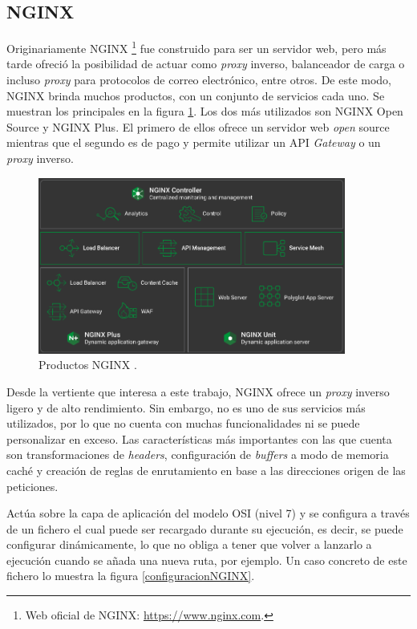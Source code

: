 \documentclass[11pt,spanish,listoffigures]{tfgetsinf}
\begin{document}

		\subsection{NGINX}

Originariamente NGINX \footnote{Web oficial de NGINX: \url{https://www.nginx.com}.} fue construido para ser un servidor web, pero más tarde ofreció la posibilidad de actuar como \emph{proxy} inverso, balanceador de carga o incluso \emph{proxy} para protocolos de correo electrónico, entre otros. De este modo, NGINX brinda muchos productos, con un conjunto de servicios cada uno. Se muestran los principales en la figura \ref{productosNGINX}. Los dos más utilizados son NGINX Open Source y NGINX Plus. El primero de ellos ofrece un servidor web \emph{open} source mientras que el segundo es de pago y permite utilizar un API \emph{Gateway} o un \emph{proxy} inverso.

\begin{figure}[ht]
\centering
\includegraphics[width=0.9\textwidth]{imagenes/productosNGINX}
\caption[Productos NGINX.]{Productos NGINX \cite{NGINX}.}
	\label{productosNGINX}
\end{figure}

Desde la vertiente que interesa a este trabajo, NGINX ofrece un \emph{proxy} inverso ligero y de alto rendimiento. Sin embargo, no es uno de sus servicios más utilizados, por lo que no cuenta con muchas funcionalidades ni se puede personalizar en exceso. Las características más importantes con las que cuenta son transformaciones de \emph{headers}, configuración de \emph{buffers} a modo de memoria caché y creación de reglas de enrutamiento en base a las direcciones origen de las peticiones.

Actúa sobre la capa de aplicación del modelo OSI (nivel 7) y se configura a través de un fichero el cual puede ser recargado durante su ejecución, es decir, se puede configurar dinámicamente, lo que no obliga a tener que volver a lanzarlo a ejecución cuando se añada una nueva ruta, por ejemplo. Un caso concreto de este fichero lo muestra la figura \ref{configuracionNGINX}.
\end{document}
